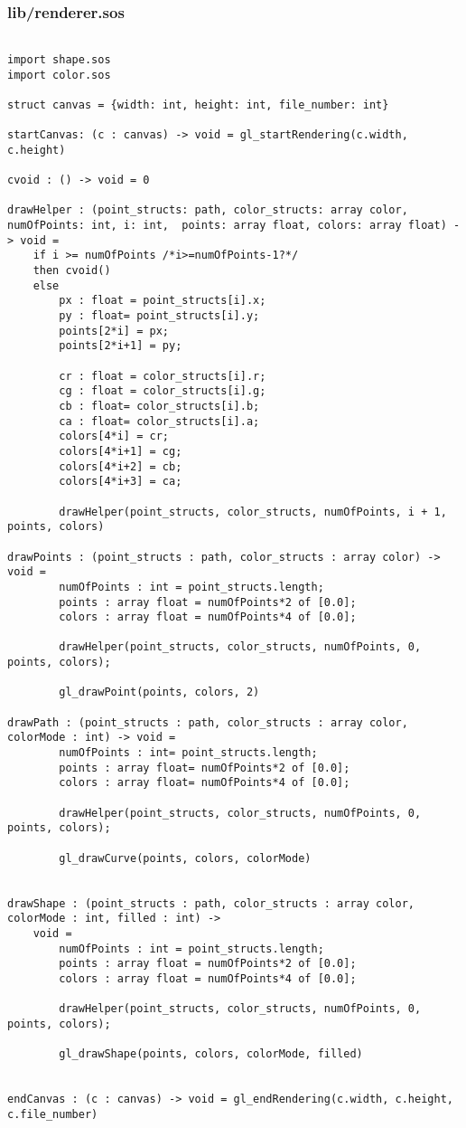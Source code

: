 \documentclass[main.tex]{subfiles}
\begin{document}
\subsubsection{lib/renderer.sos}

\begin{lstlisting}

import shape.sos
import color.sos

struct canvas = {width: int, height: int, file_number: int}

startCanvas: (c : canvas) -> void = gl_startRendering(c.width, c.height)

cvoid : () -> void = 0

drawHelper : (point_structs: path, color_structs: array color, numOfPoints: int, i: int,  points: array float, colors: array float) -> void =
    if i >= numOfPoints /*i>=numOfPoints-1?*/
    then cvoid()
    else
        px : float = point_structs[i].x;
        py : float= point_structs[i].y;
        points[2*i] = px;
        points[2*i+1] = py;

        cr : float = color_structs[i].r;
        cg : float = color_structs[i].g;
        cb : float= color_structs[i].b;
        ca : float= color_structs[i].a;
        colors[4*i] = cr;
        colors[4*i+1] = cg;
        colors[4*i+2] = cb;
        colors[4*i+3] = ca;

        drawHelper(point_structs, color_structs, numOfPoints, i + 1, points, colors)

drawPoints : (point_structs : path, color_structs : array color) -> void = 
        numOfPoints : int = point_structs.length;
        points : array float = numOfPoints*2 of [0.0];
        colors : array float = numOfPoints*4 of [0.0];
        
        drawHelper(point_structs, color_structs, numOfPoints, 0,  points, colors);

        gl_drawPoint(points, colors, 2)

drawPath : (point_structs : path, color_structs : array color,  colorMode : int) -> void = 
        numOfPoints : int= point_structs.length;
        points : array float= numOfPoints*2 of [0.0];
        colors : array float= numOfPoints*4 of [0.0];

        drawHelper(point_structs, color_structs, numOfPoints, 0,  points, colors);
        
        gl_drawCurve(points, colors, colorMode)


drawShape : (point_structs : path, color_structs : array color,  colorMode : int, filled : int) ->
    void = 
        numOfPoints : int = point_structs.length;
        points : array float = numOfPoints*2 of [0.0];
        colors : array float = numOfPoints*4 of [0.0];

        drawHelper(point_structs, color_structs, numOfPoints, 0,  points, colors);

        gl_drawShape(points, colors, colorMode, filled)


endCanvas : (c : canvas) -> void = gl_endRendering(c.width, c.height, c.file_number)
\end{lstlisting}
\end{document}
